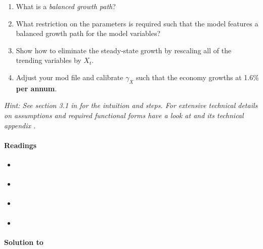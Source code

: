 \begin{enumerate}
\begin{enumerate}
  \item
  What is a \emph{balanced growth path}?

  \item
  What restriction on the parameters is required such that the model features a balanced growth path for the model variables?

  \item
  Show how to eliminate the steady-state growth by rescaling all of the trending variables by \(X_t\).

  \item
  Adjust your mod file and calibrate \(\gamma_X\) such that the economy growths at 1.6\% \textbf{per annum}.

  \end{enumerate}
\emph{Hint: See section 3.1 in \textcite{King.Rebelo_1999_ResuscitatingRealBusiness} for the intuition and steps.
For extensive technical details on assumptions and required functional forms have a look at \textcite{King.Plosser.Rebelo_1988_ProductionGrowthBusiness}
  and its technical appendix \textcite{King.Plosser.Rebelo_2002_ProductionGrowthBusiness}. }
\end{enumerate}

\paragraph{Readings}

\begin{itemize}
\item \textcite{Baxter.King_1993_FiscalPolicyGeneral}
\item \textcite{King.Rebelo_1999_ResuscitatingRealBusiness}
\item \textcite{King.Plosser.Rebelo_1988_ProductionGrowthBusiness}
\item \textcite{King.Plosser.Rebelo_2002_ProductionGrowthBusiness}
\end{itemize}

\begin{solution}\textbf{Solution to }
\ifDisplaySolutions%

\fi
\newpage
\end{solution}